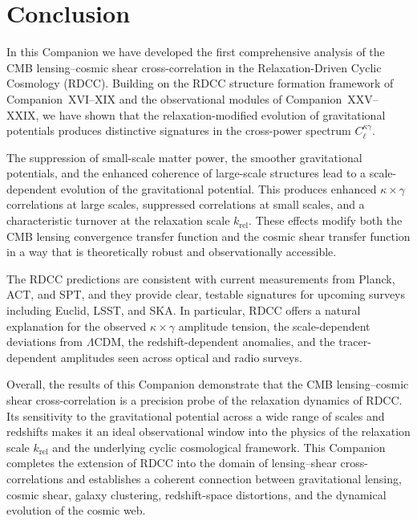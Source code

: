 \documentclass[11pt,a4paper]{article}
\begin{document}
\section{Conclusion}

In this Companion we have developed the first comprehensive analysis of the CMB 
lensing--cosmic shear cross-correlation in the Relaxation-Driven Cyclic Cosmology (RDCC). 
Building on the RDCC structure formation framework of Companion~XVI--XIX and the 
observational modules of Companion~XXV--XXIX, we have shown that the relaxation-modified 
evolution of gravitational potentials produces distinctive signatures in the cross-power 
spectrum $C_{\ell}^{\kappa\gamma}$.

The suppression of small-scale matter power, the smoother gravitational potentials, and the 
enhanced coherence of large-scale structures lead to a scale-dependent evolution of the 
gravitational potential. This produces enhanced $\kappa \times \gamma$ correlations at large 
scales, suppressed correlations at small scales, and a characteristic turnover at the 
relaxation scale $k_{\mathrm{rel}}$. These effects modify both the CMB lensing convergence 
transfer function and the cosmic shear transfer function in a way that is theoretically 
robust and observationally accessible.

The RDCC predictions are consistent with current measurements from Planck, ACT, and SPT, and 
they provide clear, testable signatures for upcoming surveys including Euclid, LSST, and 
SKA. In particular, RDCC offers a natural explanation for the observed $\kappa \times \gamma$ 
amplitude tension, the scale-dependent deviations from $\Lambda$CDM, the redshift-dependent 
anomalies, and the tracer-dependent amplitudes seen across optical and radio surveys.

Overall, the results of this Companion demonstrate that the CMB lensing--cosmic shear 
cross-correlation is a precision probe of the relaxation dynamics of RDCC. Its sensitivity 
to the gravitational potential across a wide range of scales and redshifts makes it an ideal 
observational window into the physics of the relaxation scale $k_{\mathrm{rel}}$ and the 
underlying cyclic cosmological framework. This Companion completes the extension of RDCC 
into the domain of lensing--shear cross-correlations and establishes a coherent connection 
between gravitational lensing, cosmic shear, galaxy clustering, redshift-space distortions, 
and the dynamical evolution of the cosmic web.

\end{document}
